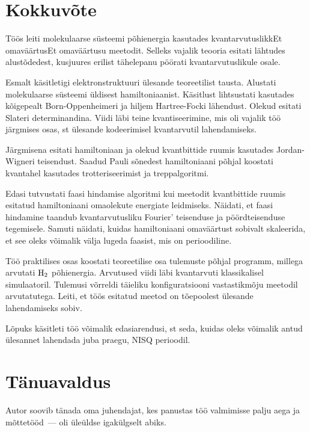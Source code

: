 \documentclass[12pt]{report}
\begin{document}
\chapter{Kokkuvõte}

Töös leiti molekulaarse süsteemi põhienergia kasutades kvantarvutuslikkEt omaväärtusEt omaväärtusu meetodit.
Selleks vajalik teooria esitati lähtudes alustõdedest, kusjuures erilist tähelepanu pöörati kvantarvutuslikule osale.

Esmalt käsitletigi elektronstruktuuri ülesande teoreetilist tausta.
Alustati molekulaarse süsteemi üldisest hamiltoniaanist.
Käsitlust lihtsustati kasutades kõigepealt Born-Oppenheimeri ja hiljem Hartree-Focki lähendust.
Olekud esitati Slateri determinandina.
Viidi läbi teine kvantiseerimine, mis oli vajalik töö järgmises osas, st ülesande kodeerimisel kvantarvutil lahendamiseks.

Järgmisena esitati hamiltoniaan ja olekud kvantbittide ruumis kasutades Jordan-Wigneri teisendust.
Saadud Pauli sõnedest hamiltoniaani põhjal koostati kvantahel kasutades trotteriseerimist ja treppalgoritmi.

Edasi tutvustati faasi hindamise algoritmi kui meetodit kvantbittide ruumis esitatud hamiltoniaani omaolekute energiate leidmiseks.
Näidati, et faasi hindamine taandub kvantarvutusliku Fourier' teisenduse ja pöördteisenduse tegemisele.
Samuti näidati, kuidas hamiltoniaani omaväärtust sobivalt skaleerida, et see oleks võimalik välja lugeda faasist, mis on perioodiline.

Töö praktilises osas koostati teoreetilise osa tulemuste põhjal programm, millega arvutati \(\rm H_2\) põhienergia.
Arvutused viidi läbi kvantarvuti klassikalisel simulaatoril.
Tulemusi võrreldi täieliku konfiguratsiooni vastastikmõju meetodil arvutatutega.
Leiti, et töös esitatud meetod on tõepoolest ülesande lahendamiseks sobiv.

Lõpuks käsitleti töö võimalik edasiarendusi, st seda, kuidas oleks võimalik antud ülesannet lahendada juba praegu, NISQ perioodil.

\chapter*{Tänuavaldus}

Autor soovib tänada oma juhendajat, kes panustas töö valmimisse palju aega ja mõttetööd~--- oli üleüldse igakülgselt abiks.

\printbibliography[heading=bibintoc, title=Kirjandus]
\end{document}
